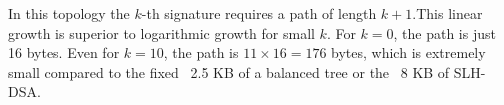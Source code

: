 In this topology the $k$-th signature requires a path of length $k+1$.This linear growth is superior 
to logarithmic growth for small $k$. For $k=0$, the path is just 16 bytes. Even for $k=10$, the path 
is $11 \times 16 = 176$ bytes, which is extremely small compared to the fixed ~2.5 KB of a balanced 
tree or the ~8 KB of SLH-DSA.